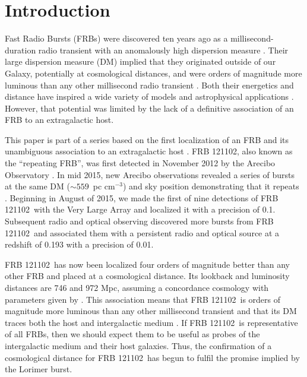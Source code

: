 \documentclass[twocolumn]{aastex61}
\newcommand{\frb}{FRB 121102}
\begin{document}
\section{Introduction}

Fast Radio Bursts (FRBs) were discovered ten years ago as a millisecond-duration radio transient with an anomalously high dispersion measure \citep[the ``Lorimer burst'';][]{2007Sci...318..777L}. Their large dispersion measure (DM) implied that they originated outside of our Galaxy, potentially at cosmological distances, and were orders of magnitude more luminous than any other millisecond radio transient \citep{2013Sci...341...53T}. Both their energetics and distance have inspired a wide variety of models and astrophysical applications \citep[e.g.,][]{2014ApJ...780L..33M, 2014ApJ...797...70K, 2016MNRAS.458L..19C, 2016MNRAS.457..232C}. However, that potential was limited by the lack of a definitive association of an FRB to an extragalactic host.

This paper is part of a series based on the first localization of an FRB and its unambiguous association to an extragalactic host \citep{LOC, OPT, EVN}. \frb, also known as the ``repeating FRB'', was first detected in November 2012 by the Arecibo Observatory \citep{2014ApJ...790..101S}. In mid 2015, new Arecibo observations revealed a series of bursts at the same DM ($\sim559$\ pc cm$^{-3}$) and sky position demonstrating that it repeats \citep{2016Natur.531..202S}. Beginning in August of 2015, we made the first of nine detections of \frb\ with the Very Large Array \citep{LOC} and localized it with a precision of 0.1\arcsec. Subsequent radio and optical observing discovered more bursts from \frb\ and associated them with a persistent radio and optical source at a redshift of 0.193 with a precision of 0.01\arcsec \citep[$\sim40$\ pc]{OPT, EVN}.

\frb\ has now been localized four orders of magnitude better than any other FRB and placed at a cosmological distance. Its lookback and luminosity distances are 746 and 972 Mpc, assuming a concordance cosmology with parameters given by \citet{2016A&A...594A..13P}. This association means that \frb\ is orders of magnitude more luminous than any other millisecond transient and that its DM traces both the host and intergalactic medium \citep{OPT}. If \frb\ is representative of all FRBs, then we should expect them to be useful as probes of the intergalactic medium and their host galaxies. Thus, the confirmation of a cosmological distance for \frb\ has begun to fulfil the promise implied by the Lorimer burst.
\end{document}
